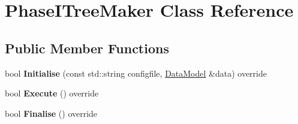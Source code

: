 \hypertarget{classPhaseITreeMaker}{
\section{PhaseITreeMaker Class Reference}
\label{classPhaseITreeMaker}
}
\subsection*{Public Member Functions}
\begin{DoxyCompactItemize}
\item 
\hypertarget{classPhaseITreeMaker_aa12e20838522941f6a22633bab68f670}{
bool {\bfseries Initialise} (const std::string configfile, \hyperlink{classDataModel}{DataModel} \&data) override}
\label{classPhaseITreeMaker_aa12e20838522941f6a22633bab68f670}

\item 
\hypertarget{classPhaseITreeMaker_ad5fc39011665bc920d1f87fdf3315b0c}{
bool {\bfseries Execute} () override}
\label{classPhaseITreeMaker_ad5fc39011665bc920d1f87fdf3315b0c}

\item 
\hypertarget{classPhaseITreeMaker_a1e910bcd77869d96213501d25a5074ca}{
bool {\bfseries Finalise} () override}
\label{classPhaseITreeMaker_a1e910bcd77869d96213501d25a5074ca}

\end{DoxyCompactItemize}
